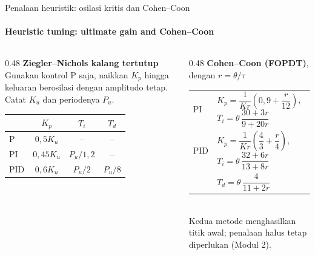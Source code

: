 \documentclass[aspectratio=169,10pt]{beamer}
\begin{document}
\begin{frame}{Penalaan heuristik: osilasi kritis dan Cohen--Coon}
	\framesubtitle{Heuristic tuning: ultimate gain and Cohen--Coon}
	\begin{columns}[T]
		\begin{column}{0.48\textwidth}
			\textbf{Ziegler--Nichols kalang tertutup}\\
			{\small Gunakan kontrol P saja, naikkan $K_p$ hingga keluaran berosilasi dengan amplitudo tetap. Catat  $K_u$ dan periodenya $P_u$.}

			\vspace{0.15cm}
			\scriptsize
			\renewcommand{\arraystretch}{1.3}
			\begin{tabular}{@{}l c c c@{}}
				\toprule
				 & $K_p$ & $T_i$ & $T_d$ \\
				\midrule
				P & $0{,}5K_u$ & -- & -- \\
				PI & $0{,}45K_u$ & $P_u/1{,}2$ & -- \\
				PID & $0{,}6K_u$ & $P_u/2$ & $P_u/8$ \\
				\bottomrule
			\end{tabular}
		\end{column}
		\begin{column}{0.48\textwidth}
			\textbf{Cohen--Coon (FOPDT)}, dengan $r = \theta/\tau$\\[2pt]
			\scriptsize
			\renewcommand{\arraystretch}{2.4}
			\begin{tabular}{@{}l l@{}}
				\toprule
				PI & $K_p = \dfrac{1}{K r}\left(0{,}9 + \dfrac{r}{12}\right)$,\ $T_i = \theta\,\dfrac{30+3r}{9+20r}$ \\
				PID & $K_p = \dfrac{1}{K r}\left(\dfrac{4}{3} + \dfrac{r}{4}\right)$,\ $T_i = \theta\,\dfrac{32+6r}{13+8r}$ \\
				    & $T_d = \theta\,\dfrac{4}{11+2r}$ \\
				\bottomrule
			\end{tabular}\\[4pt]
			\small Kedua metode menghasilkan \alert{titik awal}; penalaan halus tetap diperlukan (Modul 2).
		\end{column}
	\end{columns}
\end{frame}
\end{document}

